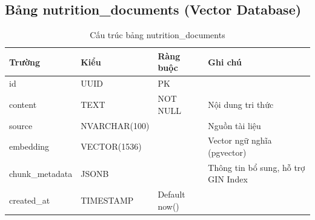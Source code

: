\documentclass[12pt,a4paper]{article}
\begin{document}
\subsection{Bảng nutrition\_documents (Vector Database)}
\begin{longtable}{|l|l|l|p{5.5cm}|}
    \caption{Cấu trúc bảng nutrition\_documents}                                               \\
    \hline
    \rowcolor{headerblue}
    \textbf{Trường} & \textbf{Kiểu} & \textbf{Ràng buộc} & \textbf{Ghi chú}                    \\
    \hline
    id              & UUID          & PK                 &                                     \\
    \hline
    content         & TEXT          & NOT NULL           & Nội dung tri thức                   \\
    \hline
    source          & NVARCHAR(100) &                    & Nguồn tài liệu                      \\
    \hline
    embedding       & VECTOR(1536)  &                    & Vector ngữ nghĩa (pgvector)         \\
    \hline
    chunk\_metadata & JSONB         &                    & Thông tin bổ sung, hỗ trợ GIN Index \\
    \hline
    created\_at     & TIMESTAMP     & Default now()      &                                     \\
    \hline
\end{longtable}
\end{document}
